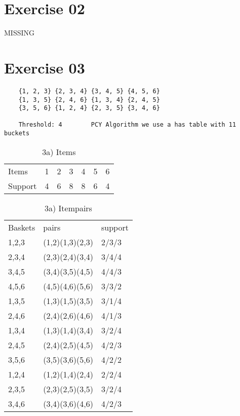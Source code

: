 \documentclass[11pt,a4paper]{scrartcl}
\begin{document}
\section*{Exercise 02}
MISSING

\section*{Exercise 03}
	\begin{verbatim}
	{1, 2, 3} {2, 3, 4} {3, 4, 5} {4, 5, 6}
	{1, 3, 5} {2, 4, 6} {1, 3, 4} {2, 4, 5}
	{3, 5, 6} {1, 2, 4} {2, 3, 5} {3, 4, 6}
	
	Threshold: 4		PCY Algorithm we use a has table with 11 buckets
	\end{verbatim}
\begin{itemize}

\begin{table}[h]
\centering
\caption{3a) Items}
\label{my-label}
\begin{tabular}{lllllll}
Items & 1 & 2 & 3 & 4 & 5 & 6 \\
Support & 4 & 6 & 8 & 8 & 6 & 4
\end{tabular}
\end{table}

\begin{table}[h]
\centering
\caption{3a) Itempairs}
\label{my-label}
\begin{tabular}{lll}
Baskets & pairs           & support \\
1,2,3   & (1,2)(1,3)(2,3) & 2/3/3   \\
2,3,4   & (2,3)(2,4)(3,4) & 3/4/4   \\
3,4,5   & (3,4)(3,5)(4,5) & 4/4/3   \\
4,5,6   & (4,5)(4,6)(5,6) & 3/3/2   \\
1,3,5   & (1,3)(1,5)(3,5) & 3/1/4   \\
2,4,6   & (2,4)(2,6)(4,6) & 4/1/3   \\
1,3,4   & (1,3)(1,4)(3,4) & 3/2/4   \\
2,4,5   & (2,4)(2,5)(4,5) & 4/2/3   \\
3,5,6   & (3,5)(3,6)(5,6) & 4/2/2   \\
1,2,4   & (1,2)(1,4)(2,4) & 2/2/4   \\
2,3,5   & (2,3)(2,5)(3,5) & 3/2/4   \\
3,4,6   & (3,4)(3,6)(4,6) & 4/2/3  
\end{tabular}
\end{table}
	

\end{itemize}
\end{document}
